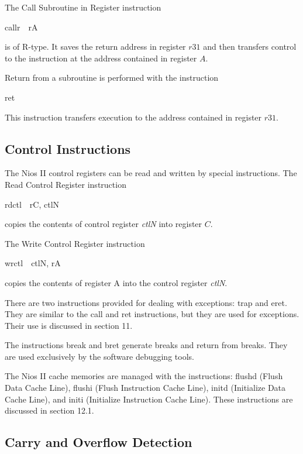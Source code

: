 \documentclass[11pt, twoside, pdftex]{article}
\begin{document}
\noindent
The Call Subroutine in Register instruction
\begin{center}
{\sf callr~~rA}
\end{center}
\noindent
is of R-type. It saves the return address in register $r31$ and then transfers control to the 
instruction at the address contained in register $A$.
 

Return from a subroutine is performed with the instruction
\begin{center}
{\sf ret}
\end{center}
\noindent
This instruction transfers execution to the address contained in register $r31$.

\subsection{Control Instructions}

The Nios II control registers can be read and written by special instructions.
The Read Control Register instruction
\begin{center}
{\sf rdctl~~rC, ctlN}
\end{center}
\noindent
copies the contents of control register {\it ctlN} into register $C$. 
 

\noindent
The Write Control Register instruction
\begin{center}
{\sf wrctl~~ctlN, rA}
\end{center}
\noindent
copies the contents of register A into the control register {\it ctlN}.
 

There are two instructions provided for dealing with exceptions: {\sf trap} and {\sf eret}.
They are similar to the {\sf call} and {\sf ret} instructions, but they are used for exceptions.
Their use is discussed in section 11.
 

The instructions {\sf break} and {\sf bret} generate breaks and return from breaks. They are used
exclusively by the software debugging tools.
 

The Nios II cache memories are managed with the instructions: {\sf flushd} (Flush Data Cache Line),
{\sf flushi} (Flush Instruction Cache Line), {\sf initd} (Initialize Data Cache Line), and
{\sf initi} (Initialize Instruction Cache Line). These instructions are discussed in section 12.1.

\subsection{Carry and Overflow Detection}
\end{document}
